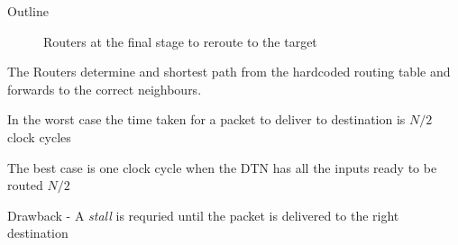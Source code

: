 \begin{frame}[allowframebreaks]{Outline}
\begin{figure}[!ht]
    \caption{Routers at the final stage to reroute to the target}
  \end{figure}
   \item The Routers determine and shortest path from the hardcoded routing table and forwards to the correct neighbours.\\
  \item In the worst case the time taken for a packet to deliver to destination is $N / 2$ clock cycles\\
  \item The best case is one clock cycle when the DTN has all the inputs ready to be routed $N / 2$\\
  \item Drawback - A \textit{stall} is requried until the packet is delivered to the right destination \\
\end{frame} 

